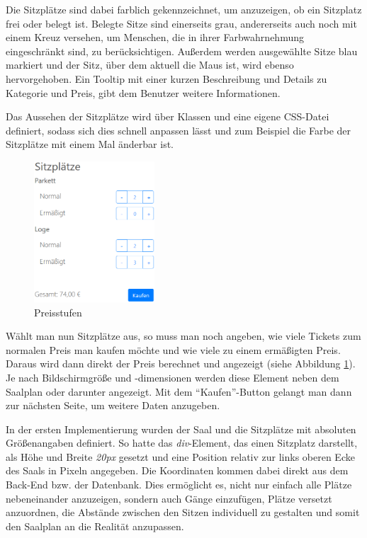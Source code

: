 Die Sitzplätze sind dabei farblich gekennzeichnet, um anzuzeigen, ob ein Sitzplatz frei oder belegt ist.
Belegte Sitze sind einerseits grau, andererseits auch noch mit einem Kreuz versehen, um Menschen, die in ihrer Farbwahrnehmung eingeschränkt sind, zu berücksichtigen.
Außerdem werden ausgewählte Sitze blau markiert und der Sitz, über dem aktuell die Maus ist, wird ebenso hervorgehoben.
Ein Tooltip mit einer kurzen Beschreibung und Details zu Kategorie und Preis, gibt dem Benutzer weitere Informationen.

Das Aussehen der Sitzplätze wird über Klassen und eine eigene \acs{CSS}-Datei definiert, sodass sich dies schnell anpassen lässt und zum Beispiel die Farbe der Sitzplätze mit einem Mal änderbar ist.

\begin{figure}[ht]
	\centering
	\includegraphics[width=0.4\textwidth]{img/screenshots/saalplan02}
	\captionsetup{format=hang}
	\caption{Preisstufen}
	\label{fig:saalplan02}
\end{figure}

Wählt man nun Sitzplätze aus, so muss man noch angeben, wie viele Tickets zum normalen Preis man kaufen möchte und wie viele zu einem ermäßigten Preis.
Daraus wird dann direkt der Preis berechnet und angezeigt (siehe Abbildung \ref{fig:saalplan02}).
Je nach Bildschirmgröße und -dimensionen werden diese Element neben dem Saalplan oder darunter angezeigt.
Mit dem \enquote{Kaufen}-Button gelangt man dann zur nächsten Seite, um weitere Daten anzugeben.

In der ersten Implementierung wurden der Saal und die Sitzplätze mit absoluten Größenangaben definiert.
So hatte das \textit{div}-Element, das einen Sitzplatz darstellt, als Höhe und Breite \textit{20px} gesetzt und eine Position relativ zur links oberen Ecke des Saals in Pixeln angegeben.
Die Koordinaten kommen dabei direkt aus dem Back-End bzw. der Datenbank.
Dies ermöglicht es, nicht nur einfach alle Plätze nebeneinander anzuzeigen, sondern auch Gänge einzufügen, Plätze versetzt anzuordnen, die Abstände zwischen den Sitzen individuell zu gestalten und somit den Saalplan an die Realität anzupassen.

